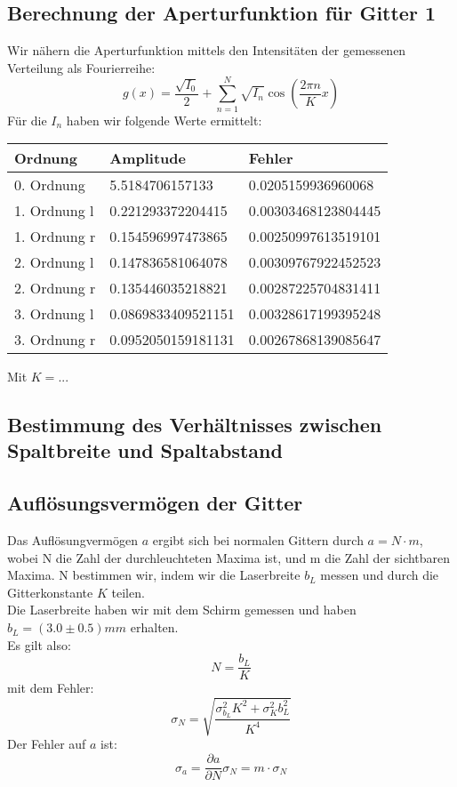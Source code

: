 \subsection{Berechnung der Aperturfunktion f\"ur Gitter 1}

Wir nähern die Aperturfunktion mittels den Intensit\"aten der gemessenen Verteilung als Fourierreihe:
$$g(x) = \frac{\sqrt{I_0}}{2} + \sum_{n=1}^N \sqrt{I_n}\cos\left(\frac{2\pi n}{K}x \right)$$
F\"ur die $I_n$ haben wir folgende Werte ermittelt:
\begin{tabular}{lll}
 \toprule
Ordnung & Amplitude & Fehler \\
\midrule
0. Ordnung & 5.5184706157133 & 0.0205159936960068 \\
1. Ordnung l & 0.221293372204415 & 0.00303468123804445 \\
1. Ordnung r & 0.154596997473865 & 0.00250997613519101 \\
2. Ordnung l & 0.147836581064078 & 0.00309767922452523 \\
2. Ordnung r & 0.135446035218821 & 0.00287225704831411 \\
3. Ordnung l & 0.0869833409521151 & 0.00328617199395248 \\
3. Ordnung r & 0.0952050159181131 & 0.00267868139085647 \\
\bottomrule
\end{tabular}



Mit $K = ... $ %

\subsection{Bestimmung des Verh\"altnisses zwischen Spaltbreite und Spaltabstand}

\subsection{Aufl\"osungsverm\"ogen der Gitter}

Das Aufl\"osungverm\"ogen $a$ ergibt sich bei normalen Gittern durch $a=N\cdot m$, wobei N die Zahl der durchleuchteten Maxima ist, und m die Zahl der sichtbaren Maxima. N bestimmen wir, indem wir die Laserbreite $b_L$ messen und durch die Gitterkonstante $K$ teilen.\\
Die Laserbreite haben wir mit dem Schirm gemessen und haben $b_L = (3.0 \pm 0.5) mm$ erhalten.\\
Es gilt also: $$N = \frac{b_L}{K}$$
mit dem Fehler: $$\sigma_N = \sqrt{\frac{\sigma_{b_L}^2K^2 + \sigma_K^2b_L^2}{K^4}}$$
Der Fehler auf $a$ ist: $$\sigma_a = \frac{\partial a}{\partial N}\sigma_N = m\cdot \sigma_N$$

